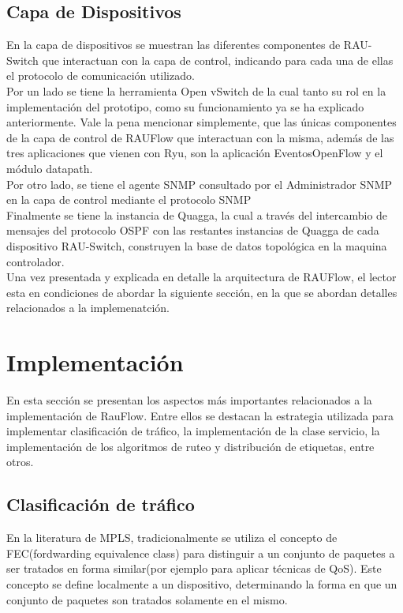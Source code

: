 \subsection{Capa de Dispositivos}
En la capa de dispositivos se muestran las diferentes componentes de RAU-Switch que interactuan con la capa de control, indicando para cada una de ellas el protocolo de comunicaci\'on utilizado.\\

Por un lado se tiene la herramienta Open vSwitch de la cual tanto su rol en la implementaci\'on del prototipo, como su funcionamiento ya se ha explicado anteriormente. Vale la pena mencionar simplemente, que las \'unicas componentes de la capa de control de RAUFlow que interactuan con la misma, adem\'as de las tres aplicaciones que vienen con Ryu, son la aplicaci\'on EventosOpenFlow y el m\'odulo datapath.\\

Por otro lado, se tiene el agente SNMP consultado por el Administrador SNMP en la capa de control mediante el protocolo SNMP\\

Finalmente se tiene la instancia de Quagga, la cual a través del intercambio de mensajes del protocolo OSPF con las restantes instancias de Quagga de cada dispositivo RAU-Switch, construyen la base de datos topol\'ogica en la maquina controlador. \\

Una vez presentada y explicada en detalle la arquitectura de RAUFlow, el lector esta en condiciones de abordar la siguiente secci\'on, en la que se abordan detalles relacionados a la implemenatci\'on.

\section[Implementaci\'on]{Implementaci\'on}

En esta secci\'on se presentan los aspectos m\'as importantes relacionados a la implementaci\'on de RauFlow. Entre ellos se destacan la estrategia utilizada para implementar clasificaci\'on de tr\'afico,  la implementaci\'on de la clase servicio, la implementaci\'on de los algoritmos de ruteo y distribución de etiquetas, entre otros.\\

\subsection{Clasificación de tr\'afico}
En la literatura de MPLS, tradicionalmente se utiliza el concepto de FEC(fordwarding equivalence class) para distinguir a un conjunto de paquetes a ser tratados en forma similar(por ejemplo para aplicar t\'ecnicas de QoS). Este concepto se define localmente a un dispositivo, determinando la forma en que un conjunto de paquetes son tratados solamente en el mismo.

